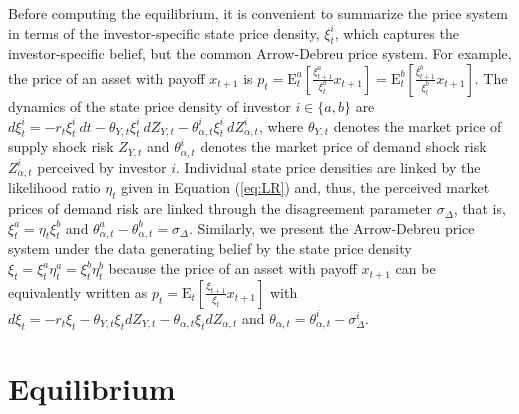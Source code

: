 \documentclass[preprint,11pt,authoryear]{elsarticle}
\theoremstyle{plain}
\begin{document}
Before computing the equilibrium, it is convenient to summarize the price system in terms of the investor-specific state price density, $\xi^i_{t}$, which captures the investor-specific belief, but the common Arrow-Debreu price system. For example, the price of an asset with payoff $x_{t+1}$ is $p_t = \mathrm{E}^a_t \left [ \frac{ \xi^a_{t+1}}{\xi^a_t} x_{t+1} \right] = \mathrm{E}^b_t \left [ \frac{ \xi^b_{t+1}}{\xi^b_t} x_{t+1} \right].$ 
The dynamics of the state price density of investor $i \in \{ a, b \}$ are $d\xi^i_{t}  =  - r_t \xi^i_t \: dt - \theta_{Y,t} \xi^i_t  \: dZ_{Y,t} - \theta^i_{\alpha,t} \xi^i_t\: dZ^i_{\alpha,t}$,  
where $\theta_{Y,t}$ denotes the market price of supply shock risk $Z_{Y,t}$ and $\theta^i_{\alpha,t}$ denotes the market price of demand shock risk $Z^i_{\alpha,t}$ perceived by investor $i$. Individual state price densities are linked by the likelihood ratio $\eta_t$ given in Equation (\ref{eq:LR}) and, thus, the perceived market prices of demand risk are linked through the disagreement parameter $\sigma_{\Delta}$, that is, $\xi^a_t = \eta_t \xi^b_t$ and $\theta^a_{\alpha,t}- \theta^b_{\alpha,t} = \sigma_{\Delta}$. Similarly, we present the Arrow-Debreu price system under the data generating belief by the state price density $\xi_t = \xi_t^a \eta_t^a = \xi_t^b \eta_t^b$ because the price of an asset with payoff $x_{t+1}$  can be equivalently written as $p_t = \mathrm{E}_t \left [ \frac{ \xi_{t+1}}{\xi_t} x_{t+1} \right]$ with $d\xi_{t} =  -r_t\xi_t - \theta_{Y,t}\xi_t dZ_{Y,t}- \theta_{\alpha,t}\xi_t dZ_{\alpha,t}$ and $\theta_{\alpha,t}  = \theta^i_{\alpha,t} - \sigma_{\Delta}^{i}$.

\section{Equilibrium}\label{sec:solution}
\end{document}
